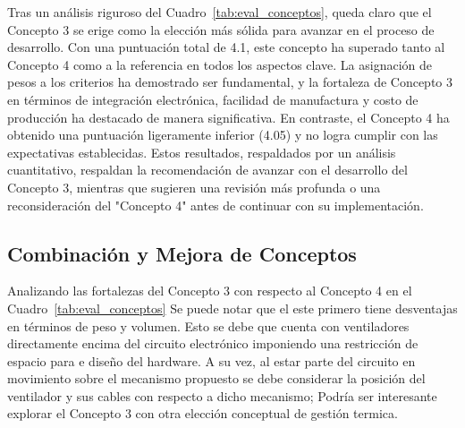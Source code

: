 Tras un análisis riguroso del Cuadro~\ref{tab:eval_conceptos}, queda claro que el Concepto 3 se erige como la elección más sólida para avanzar en el proceso de desarrollo. Con una puntuación total de 4.1, este concepto ha superado tanto al Concepto 4 como a la referencia en todos los aspectos clave. La asignación de pesos a los criterios ha demostrado ser fundamental, y la fortaleza de Concepto 3 en términos de integración electrónica, facilidad de manufactura y costo de producción ha destacado de manera significativa. En contraste, el Concepto 4 ha obtenido una puntuación ligeramente inferior (4.05) y no logra cumplir con las expectativas establecidas. Estos resultados, respaldados por un análisis cuantitativo, respaldan la recomendación de avanzar con el desarrollo del Concepto 3, mientras que sugieren una revisión más profunda o una reconsideración del "Concepto 4" antes de continuar con su implementación.

\needspace{3cm}
\subsection{Combinación y Mejora de Conceptos}
Analizando las fortalezas del Concepto 3 con respecto al Concepto 4 
 en el Cuadro~\ref{tab:eval_conceptos} Se puede notar que el este primero tiene desventajas en términos de peso y volumen. Esto se debe que cuenta con ventiladores directamente encima del circuito electrónico imponiendo una restricción de espacio para e diseño del hardware. A su vez, al estar parte del circuito en movimiento sobre el mecanismo propuesto se debe considerar la posición del ventilador y sus cables con respecto a dicho mecanismo; Podría ser interesante explorar el Concepto 3 con otra elección conceptual de gestión termica.

